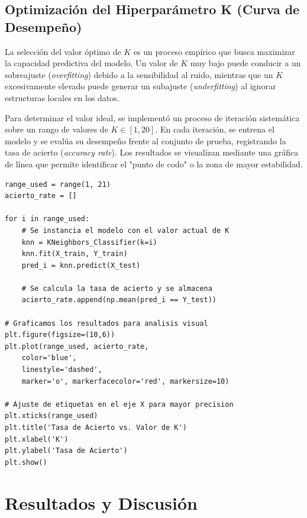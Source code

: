\documentclass[12pt]{article}
\begin{document}
\subsection{Optimización del Hiperparámetro K (Curva de Desempeño)}

La selección del valor óptimo de $K$ es un proceso empírico que busca maximizar la capacidad predictiva del modelo. Un valor de $K$ muy bajo puede conducir a un sobreajuste (\textit{overfitting}) debido a la sensibilidad al ruido, mientras que un $K$ excesivamente elevado puede generar un subajuste (\textit{underfitting}) al ignorar estructuras locales en los datos.

Para determinar el valor ideal, se implementó un proceso de iteración sistemática sobre un rango de valores de $K \in [1, 20]$. En cada iteración, se entrena el modelo y se evalúa su desempeño frente al conjunto de prueba, registrando la tasa de acierto (\textit{accuracy rate}). Los resultados se visualizan mediante una gráfica de línea que permite identificar el "punto de codo" o la zona de mayor estabilidad.

\begin{minipage}{0.9\textwidth}
\begin{lstlisting}[caption={Algoritmo de búsqueda del valor K óptimo y visualización de resultados}]
range_used = range(1, 21)
acierto_rate = []

for i in range_used:
    # Se instancia el modelo con el valor actual de K
    knn = KNeighbors_Classifier(k=i)
    knn.fit(X_train, Y_train)
    pred_i = knn.predict(X_test)
    
    # Se calcula la tasa de acierto y se almacena
    acierto_rate.append(np.mean(pred_i == Y_test))

# Graficamos los resultados para analisis visual
plt.figure(figsize=(10,6))
plt.plot(range_used, acierto_rate, 
    color='blue', 
    linestyle='dashed', 
    marker='o', markerfacecolor='red', markersize=10)

# Ajuste de etiquetas en el eje X para mayor precision
plt.xticks(range_used) 
plt.title('Tasa de Acierto vs. Valor de K')
plt.xlabel('K')
plt.ylabel('Tasa de Acierto')
plt.show()
\end{lstlisting}
\end{minipage}


\section{Resultados y Discusión}
\end{document}

